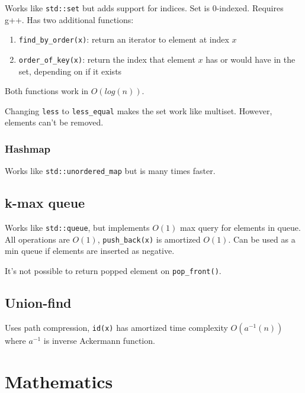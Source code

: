 \documentclass{article}
\begin{document}
Works like \texttt{std::set} but adds support for indices. Set is 0-indexed. Requires g++. Has two additional functions:

\begin{enumerate}
	\item \verb|find_by_order(x)|: return an iterator to element at index $x$
	\item \verb|order_of_key(x)|: return the index that element $x$ has or would have in the set, depending on if it exists
\end{enumerate}

Both functions work in $O(log(n))$.

Changing \texttt{less} to \verb|less_equal| makes the set work like multiset. However, elements can't be removed.



\subsubsection {Hashmap}

Works like \verb|std::unordered_map| but is many times faster.



\subsection {k-max queue}

Works like \texttt{std::queue}, but implements $O(1)$ max query for elements in queue. All operations are $O(1)$, \texttt{push\_back(x)} is amortized $O(1)$. Can be used as a min queue if elements are inserted as negative.

It's not possible to return popped element on \texttt{pop\_front()}.



\subsection{Union-find}

Uses path compression, \texttt{id(x)} has amortized time complexity $O(a^{-1}(n))$ where $a^{-1}$ is inverse Ackermann function.



\section {Mathematics}
\end{document}
